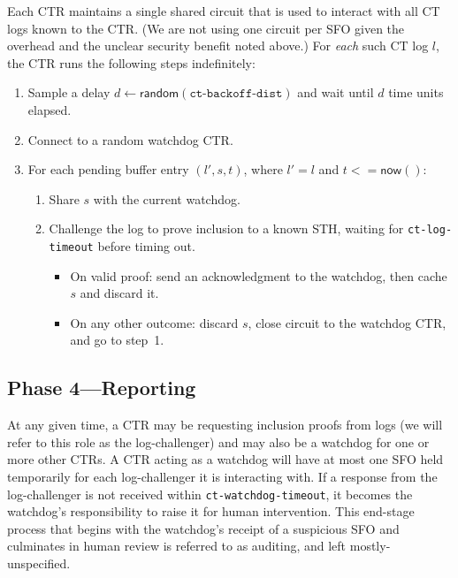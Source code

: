 Each CTR maintains a single shared circuit that is used to interact with all CT
logs known to the CTR\@. (We are not using one circuit per SFO given the
overhead and the unclear security benefit noted above.) For \emph{each} such CT
log $l$, the CTR runs the following steps indefinitely:
\begin{enumerate}
    \item\label{enm:auditing:backoff} Sample a delay $d \gets
        \mathsf{random}(\texttt{ct-backoff-dist})$ and wait until $d$ time units
        elapsed.
    \item Connect to a random watchdog CTR\@.
    \item\label{enm:auditing:loop} For each pending buffer entry $(l',s,t)$,
    where $l' = l$ and $t <= \mathsf{now}()$:
		\begin{enumerate}
			\item\label{enm:ext:auditing:watchdog} Share $s$ with the current
				watchdog.
			\item\label{enm:ext:auditing:challenge} Challenge the log to prove
                                  inclusion to a known STH, waiting for
                                  \texttt{ct-log-timeout} before timing out.
				\begin{itemize}
					\item\label{enm:ext:auditing:challenge:success} On valid
						proof: send an acknowledgment to the watchdog, then
						cache $s$ and discard it.
					\item\label{enm:ext:auditing:challenge:fail} On any other
						outcome: discard $s$, close circuit to the watchdog CTR,
						and go to step~1.
				\end{itemize}
		\end{enumerate}
\end{enumerate}

\subsection{Phase 4---Reporting}

At any given time, a CTR may be requesting inclusion proofs from logs (we will
refer to this role as the log-challenger) and may also be a watchdog for one or
more other CTRs. A CTR acting as a watchdog will have at most one SFO held
temporarily for each log-challenger it is interacting with. If a response from
the log-challenger is not received within \texttt{ct-watchdog-timeout}, it
becomes the watchdog's responsibility to raise it for human intervention. This
end-stage process that begins with the watchdog's receipt of a suspicious SFO
and culminates in human review is referred to as auditing, and left
mostly-unspecified.

